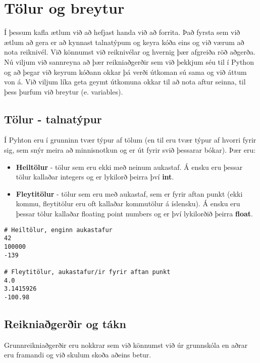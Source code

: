 
\chapter{Tölur og breytur}\label{k:tolur}
Í þessum kafla ætlum við að hefjast handa við að forrita. 
Það fyrsta sem við ætlum að gera er að kynnast talnatýpum og keyra kóða eins og við værum að nota reiknivél. 
Við könnumst við reiknivélar og hvernig þær afgreiða röð aðgerða. 
Nú viljum við sannreyna að þær reikniaðgerðir sem við þekkjum séu til í Python og að þegar við keyrum kóðann okkar þá verði útkoman sú sama og við áttum von á. 
Við viljum líka geta geymt útkomuna okkar til að nota aftur seinna, til þess þurfum við breytur (e. variables).

\section{Tölur - talnatýpur}
Í Pyhton eru í grunninn tvær týpur af tölum (en til eru tvær týpur af hvorri fyrir sig, sem snýr meira að minnisnotkun og er út fyrir svið þessarar bókar). 
Þær eru:

\begin{itemize}
	\item \textbf{Heiltölur} - tölur sem eru ekki með neinum aukastaf. 
	Á ensku eru þessar tölur kallaðar integers og er lykilorð þeirra því \textbf{int}.
	\item \textbf{Fleytitölur} - tölur sem eru með aukastaf, sem er fyrir aftan punkt (ekki kommu, fleytitölur eru oft kallaðar kommutölur á íslensku). 
	Á ensku eru þessar tölur kallaðar floating point numbers og er því lykilorðið þeirra \textbf{float}.
\end{itemize}

\begin{lstlisting}[caption=Heiltölur og fleytitölur]
# Heiltölur, enginn aukastafur
42
100000
-139

# Fleytitölur, aukastafur/ir fyrir aftan punkt
4.0
3.1415926
-100.98
\end{lstlisting}

\section{Reikniaðgerðir og tákn}
Grunnreikniaðgerðir eru nokkrar sem við könnumst við úr grunnskóla en aðrar eru framandi og við skulum skoða aðeins betur.

